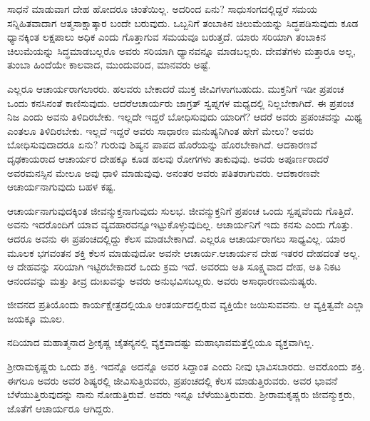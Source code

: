 ಸಾಧನೆ ಮಾಡುವಾಗ ದೇಹ ಹೋದರೂ ಚಿಂತೆಯಿಲ್ಲ. ಅದರಿಂದ ಏನು? ಸಾಧುಸಂಗದಲ್ಲಿದ್ದರೆ ಸಮಯ ಸನ್ನಿಹಿತವಾದಾಗ ಆತ್ಮಸಾಕ್ಷಾತ್ಕಾರ ಬಂದೇ ಬರುವುದು. ಒಬ್ಬನಿಗೆ ತಂಬಾಕಿನ ಚಿಲುಮೆಯನ್ನು ಸಿದ್ಧಪಡಿಸುವುದು ಕೂಡ ಧ್ಯಾನಕ್ಕಿಂತ ಲಕ್ಷಪಾಲು ಅಧಿಕ ಎಂದು ಗೊತ್ತಾಗುವ ಸಮಯವೂ ಬರುತ್ತದೆ. ಯಾರು ಸರಿಯಾಗಿ ತಂಬಾಕಿನ ಚಿಲುಮೆಯನ್ನು ಸಿದ್ಧಮಾಡಬಲ್ಲರೊ ಅವರು ಸರಿಯಾಗಿ ಧ್ಯಾನವನ್ನೂ ಮಾಡಬಲ್ಲರು. ದೇವತೆಗಳು ಮತ್ತಾರೂ ಅಲ್ಲ, ತುಂಬಾ ಹಿಂದೆಯೇ ಕಾಲವಾದ, ಮುಂದುವರಿದ, ಮಾನವರು ಅಷ್ಟೆ.

ಎಲ್ಲರೂ ಆಚಾರ್ಯರಾಗಲಾರರು. ಹಲವರು ಬೇಕಾದರೆ ಮುಕ್ತ ಜೀವಿಗಳಾಗ\-ಬಹುದು. ಮುಕ್ತನಿಗೆ ಇಡೀ ಪ್ರಪಂಚ ಒಂದು ಕನಸಿನಂತೆ ಕಾಣಿಸುವುದು. ಆದರೆ\break ಆಚಾರ್ಯರು ಜಾಗ್ರತ್​ ಸ್ವಪ್ನಗಳ ಮಧ್ಯದಲ್ಲಿ ನಿಲ್ಲಬೇಕಾಗಿದೆ. ಈ ಪ್ರಪಂಚ ನಿಜ ಎಂದು ಅವನು ತಿಳಿದಿರಬೇಕು. ಇಲ್ಲದೇ ಇದ್ದರೆ ಬೋಧಿಸುವುದು ಯಾರಿಗೆ? ಆದರೆ ಅವರು ಪ್ರಪಂಚವನ್ನು ಮಿಥ್ಯ ಎಂತಲೂ ತಿಳಿದಿರಬೇಕು. ಇಲ್ಲದೆ ಇದ್ದರೆ ಅವರು ಸಾಧಾರಣ ಮನುಷ್ಯನಿಗಿಂತ ಹೇಗೆ ಮೇಲು? ಅವರು ಬೋಧಿಸುವುದಾದರೂ ಏನು? ಗುರುವು ಶಿಷ್ಯನ ಪಾಪದ ಹೊರೆಯನ್ನು ಹೊರಬೇಕಾಗಿದೆ. ಆದಕಾರಣವೆ ದೃಢಕಾಯರಾದ ಆಚಾರ್ಯರ ದೇಹಕ್ಕೂ ಕೂಡ ಹಲವು ರೋಗಗಳು ತಾಕುವುವು. ಅವರು ಅಪೂರ್ಣರಾದರೆ ಅವರ\break ಮನಸ್ಸಿನ ಮೇಲೂ ಅವು ಧಾಳಿ ಮಾಡುವುವು. ಅನಂತರ ಅವರು ಪತಿತರಾಗುವರು. ಆದಕಾರಣವೇ ಆಚಾರ್ಯನಾಗುವುದು ಬಹಳ ಕಷ್ಟ.

ಆಚಾರ್ಯನಾಗುವುದಕ್ಕಿಂತ ಜೀವನ್ಮುಕ್ತನಾಗುವುದು ಸುಲಭ. ಜೀವನ್ಮುಕ್ತನಿಗೆ ಪ್ರಪಂಚ ಒಂದು ಸ್ವಪ್ನವೆಂದು ಗೊತ್ತಿದೆ. ಅವನು ಇದರೊಂದಿಗೆ ಯಾವ ವ್ಯವಹಾರವನ್ನೂ\break ಇಟ್ಟುಕೊಳ್ಳುವುದಿಲ್ಲ. ಆಚಾರ್ಯನಿಗೆ ಇದು ಕನಸು ಎಂದು ಗೊತ್ತು. ಆದರೂ ಅವನು ಈ ಪ್ರಪಂಚದಲ್ಲಿದ್ದು ಕೆಲಸ ಮಾಡಬೇಕಾಗಿದೆ. ಎಲ್ಲರೂ ಆಚಾರ್ಯರಾಗಲು ಸಾಧ್ಯವಿಲ್ಲ. ಯಾರ ಮೂಲಕ ಭಗವಂತನ ಶಕ್ತಿ ಕೆಲಸ ಮಾಡುವುದೋ ಅವನೇ ಆಚಾರ್ಯ.\break ಆಚಾರ್ಯನ ದೇಹ ಇತರರ ದೇಹದಂತೆ ಅಲ್ಲ. ಆ ದೇಹವನ್ನು ಸರಿಯಾಗಿ ಇಟ್ಟಿರಬೇಕಾದರೆ ಒಂದು ಕ್ರಮ ಇದೆ. ಅವರದು ಅತಿ ಸೂಕ್ಷ್ಮವಾದ ದೇಹ, ಅತಿ ನಿಕಟ ಆನಂದವನ್ನು ಮತ್ತು ತೀವ್ರ ದುಃಖವನ್ನು ಅವರು ಅನುಭವಿಸಬಲ್ಲರು. ಅವರು ಅಸಾಧಾರಣ\break ಮನುಷ್ಯರು.

ಜೀವನದ ಪ್ರತಿಯೊಂದು ಕಾರ್ಯಕ್ಷೇತ್ರದಲ್ಲಿಯೂ ಆಂತರ್ಯದಲ್ಲಿರುವ ವ್ಯಕ್ತಿಯೇ ಜಯಿಸುವವನು. ಆ ವ್ಯಕ್ತಿತ್ವವೇ ಎಲ್ಲಾ ಜಯಕ್ಕೂ ಮೂಲ.

ನದಿಯಾದ ಮಹಾತ್ಮನಾದ ಶ‍್ರೀಕೃಷ್ಣ ಚೈತನ್ಯನಲ್ಲಿ ವ್ಯಕ್ತವಾದಷ್ಟು ಮಹಾಭಾವ\break ಮತ್ತೆಲ್ಲಿಯೂ ವ್ಯಕ್ತವಾಗಿಲ್ಲ.

ಶ‍್ರೀರಾಮಕೃಷ್ಣರು ಒಂದು ಶಕ್ತಿ. ಇದನ್ನೊ ಅದನ್ನೊ ಅವರ ಸಿದ್ದಾಂತ ಎಂದು ನೀವು ಭಾವಿಸಬಾರದು. ಅವರೊಂದು ಶಕ್ತಿ. ಈಗಲೂ ಅವರು ಅವರ ಶಿಷ್ಯರಲ್ಲಿ ಜೀವಿಸುತ್ತಿರುವರು, ಪ್ರಪಂಚದಲ್ಲಿ ಕೆಲಸ ಮಾಡುತ್ತಿರುವರು. ಅವರ ಭಾವನೆ ಬೆಳೆಯುತ್ತಿರುವುದನ್ನು ನಾನು ನೋಡುತ್ತಿರುವೆ. ಅವರು ಇನ್ನೂ ಬೆಳೆಯುತ್ತಿರುವರು. ಶ‍್ರೀರಾಮಕೃಷ್ಣರು ಜೀವನ್ಮುಕ್ತರು, ಜೊತೆಗೆ ಆಚಾರ್ಯರೂ ಆಗಿದ್ದರು.

